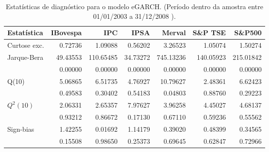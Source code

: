 \begin{table}[H]
\centering
\caption{Estatísticas de diagnóstico para o modelo eGARCH. 
               (Período dentro da amostra entre 01/01/2003 a 31/12/2008 ).} 
\label{tab:garchstats}
\begin{tabular}{lrrrrrr}
  \hline
Estatística & IBovespa & IPC & IPSA & Merval & S\&P TSE & S\&P500 \\ 
  \hline
Curtose exc. & 0.72736 & 1.09088 & 0.56202 & 3.26523 & 1.05074 & 1.50274 \\ 
  Jarque-Bera & 49.43553 & 110.65485 & 34.73272 & 745.13236 & 140.05923 & 215.01842 \\ 
   & 0.00000 & 0.00000 & 0.00000 & 0.00000 & 0.00000 & 0.00000 \\ 
  Q(10) & 5.06865 & 6.51735 & 4.76927 & 10.79627 & 2.48361 & 6.62423 \\ 
   & 0.49583 & 0.30402 & 0.54183 & 0.04803 & 0.88760 & 0.29223 \\ 
  $Q^2(10)$ & 2.06331 & 2.65357 & 7.97627 & 3.96258 & 4.45027 & 4.68137 \\ 
   & 0.93212 & 0.86672 & 0.17130 & 0.67110 & 0.59236 & 0.55562 \\ 
  Sign-bias & 1.42255 & 0.01692 & 1.14179 & 0.39020 & 0.48399 & 0.34565 \\ 
   & 0.15508 & 0.98650 & 0.25373 & 0.69645 & 0.62847 & 0.72966 \\ 
   \hline
\end{tabular}
\end{table}
